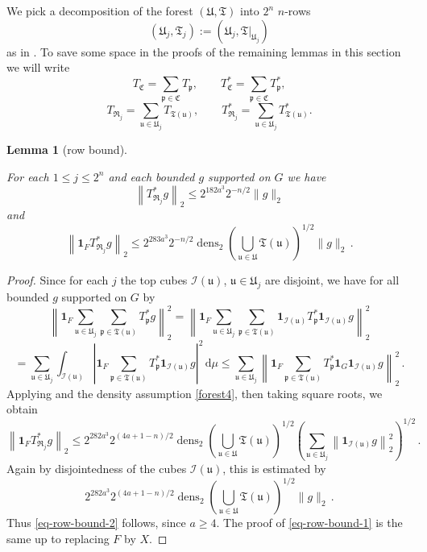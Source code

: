 \documentclass[10pt,a4paper]{article}
\theoremstyle{plain}
\newtheorem{lemma}[theorem]{Lemma}
\theoremstyle{definition}
\numberwithin{equation}{subsection}
\DeclareMathOperator{\dens}{\operatorname{dens}}
\newcommand{\fp}{{\mathfrak p}}
\newcommand{\fu}{{\mathfrak u}}
\newcommand{\fU}{{\mathfrak U}}
\newcommand{\fT}{{\mathfrak T}}
\newcommand{\fC}{{\mathfrak C}}
\newcommand{\scI}{{\mathcal{I}}} %
\newcommand{\lean}[1]{}
\newcommand{\uses}[1]{}
\newcommand{\leanok}{}
\begin{document}
We pick a decomposition of the forest $(\fU, \fT)$ into $2^n$ $n$-rows
\begin{equation*}
(\fU_j, \fT_j) := (\fU_j, \fT|_{\fU_j})
\end{equation*}
as in . To save some space in the proofs of the remaining lemmas in this section we will write
    $$
        T_{\fC} = \sum_{\fp \in \fC} T_{\fp},\qquad T_{\fC}^* = \sum_{\fp \in \fC} T_{\fp}^*,
    $$
    $$
        T_{\mathfrak{R}_j} = \sum_{\fu \in \fU_j} T_{\fT(\fu)},\qquad T_{\mathfrak{R}_j}^* = \sum_{\fu \in \fU_j} T_{\fT(\fu)}^*.
    $$
\begin{lemma}[row bound]
    \label{row-bound}
    \leanok
    \lean{TileStructure.Forest.row_bound, TileStructure.Forest.indicator_row_bound}
    \uses{adjoint-tile-support,adjoint-tree-estimate}
    For each $1 \le j \le 2^n$ and each bounded $g$ supported on $G$ we have
    \begin{equation}
        \label{eq-row-bound-1}
        \left\| T_{\mathfrak{R}_j}^*g \right\|_2 \le 2^{182a^3} 2^{-n/2} \|g\|_2
    \end{equation}
    and
    \begin{equation}
        \label{eq-row-bound-2}
        \left\| \mathbf{1}_F T_{\mathfrak{R}_j}^*g \right\|_2 \le 2^{283a^3} 2^{-n/2} \dens_2(\bigcup_{\fu\in \fU}\fT(\fu))^{1/2} \|g\|_2\,.
    \end{equation}
\end{lemma}

\begin{proof}
    \leanok
    Since for each $j$ the top cubes $\scI(\fu)$, $\fu \in \fU_j$ are disjoint, we have for all bounded $g$ supported on $G$ by 
    $$
        \left\|\mathbf{1}_F \sum_{\fu \in \fU_j} \sum_{\fp \in \fT(\fu)} T_{\fp}^* g\right\|_2^2 = \left\|\mathbf{1}_F \sum_{\fu \in \fU_j} \sum_{\fp \in \fT(\fu)} \mathbf{1}_{\scI(\fu)} T_{\fp}^* \mathbf{1}_{\scI(\fu)} g\right\|_2^2
    $$
    $$
        = \sum_{\fu \in \fU_j} \int_{\scI(\fu)} \left| \mathbf{1}_F \sum_{\fp \in \fT(\fu)} T_{\fp}^* \mathbf{1}_{\scI(\fu)} g\right|^2 \, \mathrm{d}\mu
        \le \sum_{\fu \in \fU_j} \left\|\mathbf{1}_F \sum_{\fp \in \fT(\fu)} T_{\fp}^* \mathbf{1}_G \mathbf{1}_{\scI(\fu)}  g\right\|_2^2\,.
    $$
    Applying  and the density assumption \eqref{forest4}, then taking square roots, we obtain
    $$
        \left\| \mathbf{1}_F T_{\mathfrak{R}_j}^*g \right\|_2 \le 2^{282a^3} 2^{(4a+1-n)/2} \dens_2(\bigcup_{\fu\in \fU}\fT(\fu))^{1/2} \left( \sum_{\fu \in \fU_j} \left\| \mathbf{1}_{\scI(\fu)} g\right\|_2^2 \right)^{1/2}\,.
    $$
    Again by disjointedness of the cubes $\scI(\fu)$, this is estimated by
    $$
        2^{282a^3} 2^{(4a+1-n)/2} \dens_2(\bigcup_{\fu\in \fU}\fT(\fu))^{1/2} \|g\|_2\,.
    $$
    Thus \eqref{eq-row-bound-2} follows, since $a \ge 4$. The proof of \eqref{eq-row-bound-1} is the same up to replacing $F$ by $X$.
\end{proof}
\end{document}
